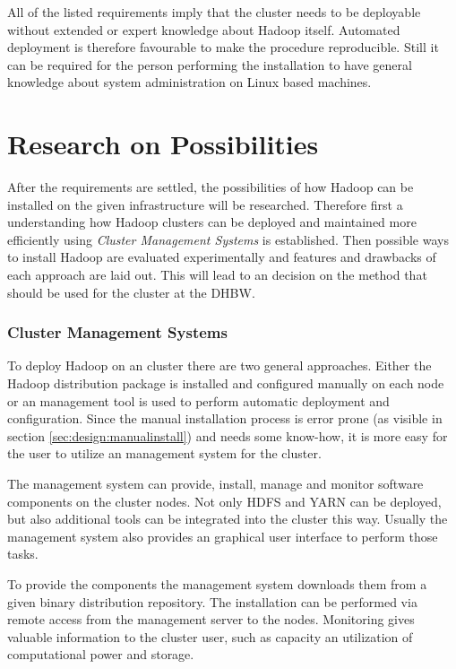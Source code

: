 All of the listed requirements imply that the cluster needs to be deployable without extended or expert knowledge about Hadoop itself.
Automated deployment is therefore favourable to make the procedure reproducible. 
Still it can be required for the person performing the installation to have general knowledge about system administration on Linux based machines.


\section{Research on Possibilities}

After the requirements are settled,
the possibilities of how Hadoop can be installed 
on the given infrastructure will be researched. Therefore first a understanding how Hadoop clusters can be deployed and maintained more efficiently using \emph{Cluster Management Systems} is established.
Then possible ways to install Hadoop are evaluated experimentally and features and drawbacks of each approach are laid out.
This will lead to an decision on the method that should be used for the cluster at the \ac{DHBW}.

\subsubsection{Cluster Management Systems}
\label{sec:design:clustermanagement}
To deploy Hadoop on an cluster there are two general approaches. Either the Hadoop distribution package is installed and configured manually on each node or an management tool is used to perform automatic deployment and configuration. 
Since the manual installation process is error prone (as visible in section \ref{sec:design:manualinstall}) and needs some know-how,
it is  more easy for the user to utilize an management system for the cluster.

The management system can provide, install, manage and monitor software components on the cluster nodes.
Not only \ac{HDFS} and \ac{YARN} can be deployed,
but also additional tools can be integrated into the cluster this way.
Usually the management system also provides an graphical user interface to perform those tasks.

To provide the components the management system downloads them from a given binary distribution repository. The installation can be performed via remote access from the management server to the nodes. Monitoring gives valuable information to the cluster user, such as capacity an utilization of computational power and storage.

